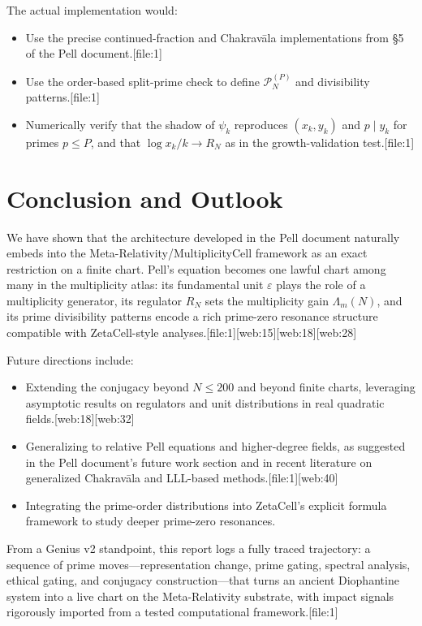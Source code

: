 \documentclass[11pt]{article}
\begin{document}
The actual implementation would:

\begin{itemize}
  \item Use the precise continued-fraction and Chakrav\=ala implementations
        from §5 of the Pell document.[file:1]
  \item Use the order-based split-prime check to define
        \(\mathcal{P}_N^{(P)}\) and divisibility patterns.[file:1]
  \item Numerically verify that the shadow of \(\psi_k\) reproduces
        \((x_k,y_k)\) and \(p\mid y_k\) for primes \(p\le P\), and that
        \(\log x_k/k \to R_N\) as in the growth-validation test.[file:1]
\end{itemize}

\section{Conclusion and Outlook}

We have shown that the architecture developed in the Pell document
naturally embeds into the Meta-Relativity/Multi\-plicityCell framework as
an exact restriction on a finite chart. Pell's equation becomes one
lawful chart among many in the multiplicity atlas: its fundamental unit
\(\varepsilon\) plays the role of a multiplicity generator, its regulator
\(R_N\) sets the multiplicity gain \(\Lambda_m(N)\), and its prime
divisibility patterns encode a rich prime-zero resonance structure
compatible with ZetaCell-style analyses.[file:1][web:15][web:18][web:28]

Future directions include:

\begin{itemize}
  \item Extending the conjugacy beyond \(N \le 200\) and beyond finite
        charts, leveraging asymptotic results on regulators and unit
        distributions in real quadratic fields.[web:18][web:32]
  \item Generalizing to relative Pell equations and higher-degree fields,
        as suggested in the Pell document's future work section and in
        recent literature on generalized Chakrav\=ala and LLL-based
        methods.[file:1][web:40]
  \item Integrating the prime-order distributions into ZetaCell's explicit
        formula framework to study deeper prime-zero resonances.
\end{itemize}

From a Genius v2 standpoint, this report logs a fully traced trajectory:
a sequence of prime moves---representation change, prime gating, spectral
analysis, ethical gating, and conjugacy construction---that turns an
ancient Diophantine system into a live chart on the Meta-Relativity
substrate, with impact signals rigorously imported from a tested
computational framework.[file:1]
\end{document}
